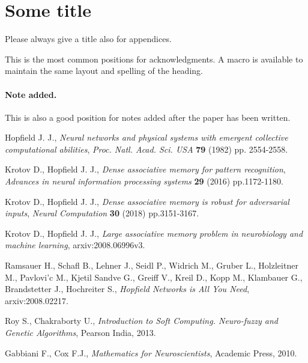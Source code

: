 \documentclass[letterpaper,12pt]{article}
\begin{document}
\appendix
\section{Some title}
Please always give a title also for appendices.





\acknowledgments

This is the most common positions for acknowledgments. A macro is
available to maintain the same layout and spelling of the heading.

\paragraph{Note added.} This is also a good position for notes added
after the paper has been written.



\begin{thebibliography}{99}

Hopfield J. J., \emph{Neural networks and physical systems with emergent collective computational abilities}, \emph{Proc. Natl. Acad. Sci. USA} {\bf 79} (1982) pp. 2554-2558.

Krotov D., Hopfield J. J., \emph{Dense associative memory for pattern recognition}, \emph{Advances in neural information processing systems} {\bf 29} (2016) pp.1172-1180.

Krotov D., Hopfield J. J., \emph{Dense associative memory is robust for adversarial inputs}, \emph{Neural Computation} {\bf 30} (2018) pp.3151-3167.

Krotov D., Hopfield J. J., \emph{Large associative memory problem in neurobiology and machine learning}, arxiv:2008.06996v3.

Ramsauer H., Schafl B., Lehner J., Seidl P., Widrich M., Gruber L., Holzleitner M., Pavlovi'c M., Kjetil Sandve G., Greiff V., Kreil D., Kopp M., Klambauer G., Brandstetter J., Hochreiter S., \emph{Hopfield Networks is All You Need}, arxiv:2008.02217.

Roy S., Chakraborty U., \emph{Introduction to Soft Computing. Neuro-fuzzy and Genetic Algorithms}, Pearson India, 2013.

Gabbiani F., Cox F.J., \emph{Mathematics for Neuroscientists}, Academic Press, 2010.

\end{thebibliography}
\end{document}
